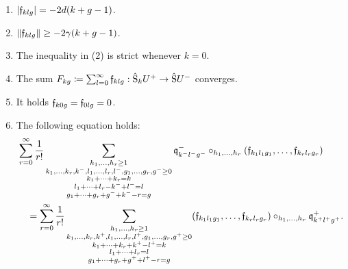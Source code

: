 \documentclass[\MainFolder/Text.tex]{subfiles}
\begin{document}
\begin{Proposition}
\begin{ClaimList}
\begin{enumerate}[label=(\arabic*)]
\item $|\mathfrak{f}_{klg}| = -2d(k+g-1)$.
\item $\| \mathfrak{f}_{klg} \|\ge -2\gamma(k+g-1)$.
\item The inequality in (2) is strict whenever $k=0$.
\item The sum $F_{kg}\coloneqq \sum_{l=0}^\infty \mathfrak{f}_{klg}: \hat{\mathrm{S}}_k U^+ \rightarrow \hat{\mathrm{S}}U^-$ converges.
\item It holds $\mathfrak{f}_{k0g}=\mathfrak{f}_{0lg}=0$.
\item The following equation holds:
\begin{equation}\label{Eq:WeakIBLMor}\begin{multlined}
\sum_{r=0}^\infty \frac{1}{r!}\sum_{\substack{h_1, \dotsc, h_r \ge 1 \\ k_1, \dotsc, k_r, k^-, l_1, \dotsc, l_r, l^-, g_1, \dotsc, g_r, g^-\ge 0 \\k_1 + \dotsb + k_r = k \\ l_1+ \dotsb + l_r - k^- + l^- = l \\ g_1 + \dotsb + g_r + g^- + k^- - r = g}} \OPQ_{k^- l^- g^-}^-\circ_{h_1,\dotsc,h_r}(\HTP_{k_1 l_1 g_1},\dotsc,\HTP_{k_r l_r g_r}) \\ = \sum_{r=0}^\infty\frac{1}{r!}\sum_{\substack{h_1, \dotsc, h_r \ge 1\\k_1, \dotsc, k_r, k^+, l_1, \dotsc, l_r, l^+, g_1, \dotsc, g_r, g^+ \ge 0 \\k_1 + \dotsb + k_r + k^+ - l^+ = k \\ l_1+ \dotsb + l_r = l \\ g_1 + \dotsb + g_r + g^+ + l^+ - r = g}} (\HTP_{k_1 l_1 g_1},\dotsc,\HTP_{k_r l_r g_r})\circ_{h_1,\dotsc,h_r}\OPQ_{k^+ l^+ g^+}^+.
\end{multlined}\end{equation}

\end{enumerate}
\end{ClaimList}
\end{Proposition}
\end{document}
